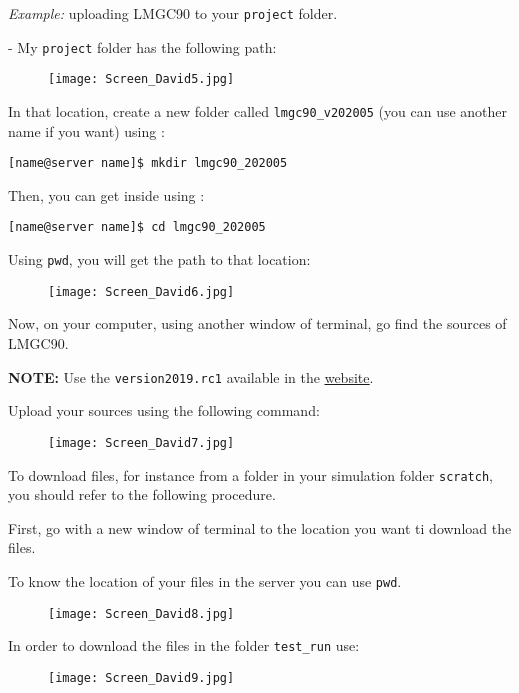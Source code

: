 \documentclass[12pt]{article}
\begin{document}
\textit{Example:} uploading LMGC90 to your \texttt{project} folder.

    - My \texttt{project} folder has the following path:
\begin{figure}[H]
  \centering
  \texttt{[image: Screen\_David5.jpg]}
\end{figure}

In that location, create a new folder called \texttt{lmgc90\_v202005} (you can use another name if you want) using :
\begin{tcolorbox}
\texttt{[name@server name]\$ mkdir lmgc90\_202005}
\end{tcolorbox}

Then, you can get inside using :
\begin{tcolorbox}
\texttt{[name@server name]\$ cd lmgc90\_202005}
\end{tcolorbox}

Using \texttt{pwd}, you will get the path to that location:
\begin{figure}[H]
  \centering
  \texttt{[image: Screen\_David6.jpg]}
\end{figure}

Now, on your computer, using another window of terminal, go find the sources of LMGC90.

\textbf{NOTE:} Use the \texttt{version2019.rc1} available in the \href{https://git-xen.lmgc.univ-montp2.fr/lmgc90/lmgc90_user/-/wikis/download_and_install}{\underline{website}}.

Upload your sources using the following command:
\begin{figure}[H]
  \centering
  \texttt{[image: Screen\_David7.jpg]}
\end{figure}

To download files, for instance from a folder in your simulation folder \texttt{scratch}, you should refer to the following procedure.

First, go with a new window of terminal to the location you want ti download the files.

To know the location of your files in the server you can use \texttt{pwd}.
\begin{figure}[H]
  \centering
  \texttt{[image: Screen\_David8.jpg]}
\end{figure}

In order to download the files in the folder \texttt{test\_run} use:
\begin{figure}[H]
  \centering
  \texttt{[image: Screen\_David9.jpg]}
\end{figure}
\end{document}
